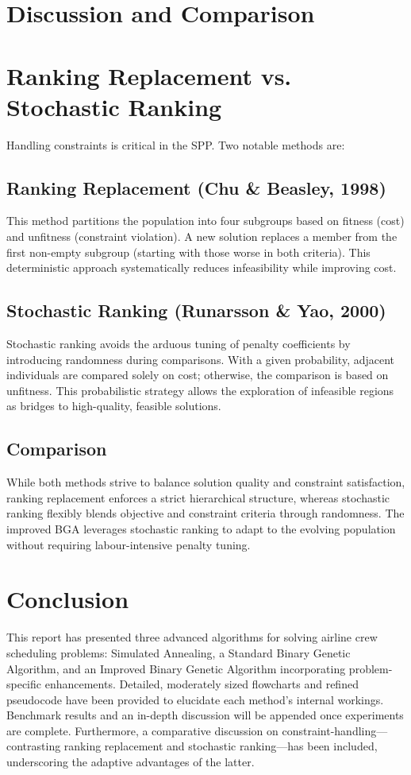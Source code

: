 \documentclass[12pt]{article}
\begin{document}
\section{Discussion and Comparison}
\label{sec:discussion}


\section{Ranking Replacement vs. Stochastic Ranking}
\label{sec:ranking}
Handling constraints is critical in the SPP. Two notable methods are:

\subsection*{Ranking Replacement (Chu \& Beasley, 1998)}
This method partitions the population into four subgroups based on fitness (cost) and unfitness (constraint violation). A new solution replaces a member from the first non-empty subgroup (starting with those worse in both criteria). This deterministic approach systematically reduces infeasibility while improving cost.

\subsection*{Stochastic Ranking (Runarsson \& Yao, 2000)}
Stochastic ranking avoids the arduous tuning of penalty coefficients by introducing randomness during comparisons. With a given probability, adjacent individuals are compared solely on cost; otherwise, the comparison is based on unfitness. This probabilistic strategy allows the exploration of infeasible regions as bridges to high-quality, feasible solutions.

\subsection*{Comparison}
While both methods strive to balance solution quality and constraint satisfaction, ranking replacement enforces a strict hierarchical structure, whereas stochastic ranking flexibly blends objective and constraint criteria through randomness. The improved BGA leverages stochastic ranking to adapt to the evolving population without requiring labour-intensive penalty tuning.

\section{Conclusion}
This report has presented three advanced algorithms for solving airline crew scheduling problems: Simulated Annealing, a Standard Binary Genetic Algorithm, and an Improved Binary Genetic Algorithm incorporating problem-specific enhancements. Detailed, moderately sized flowcharts and refined pseudocode have been provided to elucidate each method's internal workings. Benchmark results and an in-depth discussion will be appended once experiments are complete. Furthermore, a comparative discussion on constraint-handling—contrasting ranking replacement and stochastic ranking—has been included, underscoring the adaptive advantages of the latter.
\end{document}
